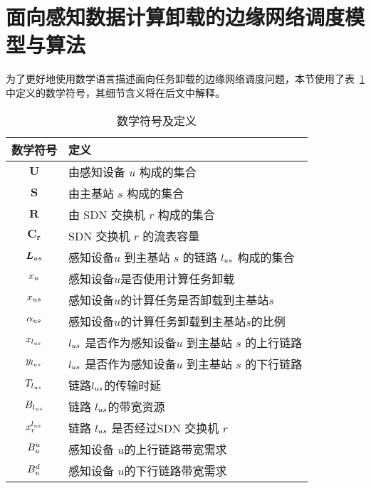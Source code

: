 

\section{面向感知数据计算卸载的边缘网络调度模型与算法}

为了更好地使用数学语言描述面向任务卸载的边缘网络调度问题，本节使用了表~\ref{table_notations_ispa} 中定义的数学符号，其细节含义将在后文中解释。

\begin{table}[!h]
  \caption{数学符号及定义}
  \vspace{-1em}
  \label{table_notations_ispa}
  \centering
  \begin{tabular}{|c|p{8cm}|}
    \hline
    \textbf{数学符号} & \textbf{定义}\\
    \hline
    $\boldsymbol{U}$ & 由感知设备 $u$ 构成的集合\\\hline
    $\boldsymbol{S}$ & 由主基站 $s$ 构成的集合\\\hline
    $\boldsymbol{R}$ & 由 SDN 交换机 $r$ 构成的集合\\\hline
    $\boldsymbol{C_r}$ & SDN 交换机 $r$ 的流表容量\\\hline
    $\boldsymbol{L}_{us}$ & 感知设备$u$ 到主基站 $s$ 的链路 $l_{us}$ 构成的集合\\\hline
    ${x}_{u}$ & 感知设备$u$是否使用计算任务卸载\\\hline
    ${x}_{us}$ & 感知设备$u$的计算任务是否卸载到主基站$s$\\\hline
    ${\alpha}_{us}$ & 感知设备$u$的计算任务卸载到主基站$s$的比例\\\hline
    $x_{l_{us}}$ & $l_{us}$ 是否作为感知设备$u$ 到主基站 $s$ 的上行链路\\\hline
    $y_{l_{us}}$ & $l_{us}$ 是否作为感知设备$u$ 到主基站 $s$ 的下行链路\\\hline
    $T_{l_{us}}$ & 链路$l_{us}$的传输时延\\\hline
    $B_{l_{us}}$ & 链路 $l_{us}$的带宽资源\\\hline
    $x^{l_{us}}_{r}$ & 链路 $l_{us}$ 是否经过SDN 交换机 $r$\\\hline
    $B^{u}_u$ & 感知设备 $u$的上行链路带宽需求\\\hline
    $B^{d}_u$ & 感知设备 $u$的下行链路带宽需求\\\hline

\end{tabular}
\end{table}
